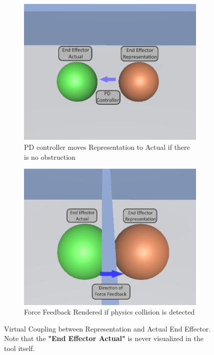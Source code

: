 \begin{figure}[htbp]
    \centering
    \begin{subfigure}[b]{0.4\textwidth}
        \centering
        \includegraphics[width=\textwidth]{images/approach-virtual-coupling-a.png}
        \caption{PD controller moves Representation to Actual if there is no obstruction}
        \label{fig:virtual-coupling-a}
    \end{subfigure}
    \quad
    \quad
    \begin{subfigure}[b]{0.4\textwidth}
        \centering
        \includegraphics[width=\textwidth]{images/approach-virtual-coupling-b.png}
        \caption{Force Feedback Rendered if physics collision is detected}
        \label{fig:virtual-coupling-b}
    \end{subfigure}
    \caption{Virtual Coupling between Representation and Actual End Effector. Note that the \textbf{"End Effector Actual"} is never visualized in the tool itself.}
    \label{fig:virtual-coupling}
\end{figure}

